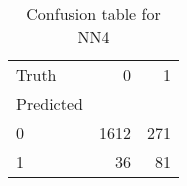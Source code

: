 \begin{table}[h!]
\caption{Confusion table for NN4}
\label{tab:NN4}
\begin{tabular}{lrr}
\toprule
Truth & 0 & 1 \\
Predicted &  &  \\
\midrule
0 & 1612 & 271 \\
1 & 36 & 81 \\
\bottomrule
\end{tabular}
\end{table}

